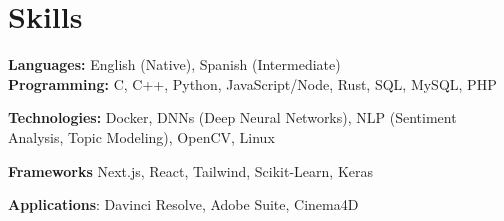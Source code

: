 \documentclass[letterpaper,11pt]{article}
\newcommand{\resumeSubHeadingListStart}{\begin{itemize}[leftmargin=0.15in, label={}]}
\newcommand{\resumeSubHeadingListEnd}{\end{itemize}}
\begin{document}
\section{Skills}
\vspace{2pt}
\resumeSubHeadingListStart
\small{\item{
\textbf{Languages:}{ English (Native), Spanish (Intermediate)}
\\ \vspace{2pt}
\textbf{Programming:}{ C, C++, Python, JavaScript/Node, Rust, SQL, MySQL, PHP} \\ \vspace{2pt}

\textbf{Technologies:}{ Docker, DNNs (Deep Neural Networks), NLP (Sentiment Analysis, Topic
Modeling), OpenCV, Linux } \\ \vspace{2pt}

\textbf{Frameworks}{ Next.js, React, Tailwind, Scikit-Learn, Keras} \\ \vspace{2pt}


\textbf{Applications}{: Davinci Resolve, Adobe Suite, Cinema4D } \vspace{2pt}
}}
\resumeSubHeadingListEnd





\end{document}

